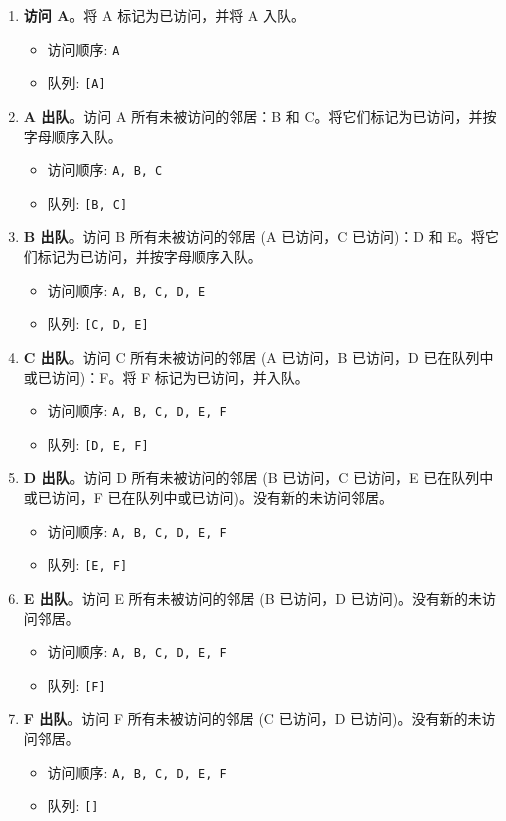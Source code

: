 \begin{enumerate}
	\item \textbf{访问 A}。将 A 标记为已访问，并将 A 入队。
	\begin{itemize}
		\item 访问顺序: \lstinline{A}
		\item 队列: \lstinline{[A]}
	\end{itemize}
	\item \textbf{A 出队}。访问 A 所有未被访问的邻居：B 和 C。将它们标记为已访问，并按字母顺序入队。
	\begin{itemize}
		\item 访问顺序: \lstinline{A, B, C}
		\item 队列: \lstinline{[B, C]}
	\end{itemize}
	\item \textbf{B 出队}。访问 B 所有未被访问的邻居 (A 已访问，C 已访问)：D 和 E。将它们标记为已访问，并按字母顺序入队。
	\begin{itemize}
		\item 访问顺序: \lstinline{A, B, C, D, E}
		\item 队列: \lstinline{[C, D, E]}
	\end{itemize}
	\item \textbf{C 出队}。访问 C 所有未被访问的邻居 (A 已访问，B 已访问，D 已在队列中或已访问)：F。将 F 标记为已访问，并入队。
	\begin{itemize}
		\item 访问顺序: \lstinline{A, B, C, D, E, F}
		\item 队列: \lstinline{[D, E, F]}
	\end{itemize}
	\item \textbf{D 出队}。访问 D 所有未被访问的邻居 (B 已访问，C 已访问，E 已在队列中或已访问，F 已在队列中或已访问)。没有新的未访问邻居。
	\begin{itemize}
		\item 访问顺序: \lstinline{A, B, C, D, E, F}
		\item 队列: \lstinline{[E, F]}
	\end{itemize}
	\item \textbf{E 出队}。访问 E 所有未被访问的邻居 (B 已访问，D 已访问)。没有新的未访问邻居。
	\begin{itemize}
		\item 访问顺序: \lstinline{A, B, C, D, E, F}
		\item 队列: \lstinline{[F]}
	\end{itemize}
	\item \textbf{F 出队}。访问 F 所有未被访问的邻居 (C 已访问，D 已访问)。没有新的未访问邻居。
	\begin{itemize}
		\item 访问顺序: \lstinline{A, B, C, D, E, F}
		\item 队列: \lstinline{[]}
	\end{itemize}
\end{enumerate}


